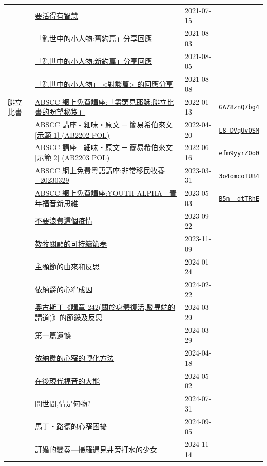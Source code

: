 \documentclass{book}
\begin{document}
{\begin{xltabular}{\textwidth}{|p{0.15\textwidth} p{0.6\textwidth}|p{0.07\textwidth} p{0.1\textwidth}|}
    & \hyperref[sec:2]{要活得有智慧} & 2021-07-15 &  \\
    & \hyperref[sec:3]{「亂世中的小人物:舊約篇」分享回應} & 2021-08-03 &  \\
    & \hyperref[sec:4]{「亂世中的小人物:新約篇」分享回應} & 2021-08-05 &  \\
    & \hyperref[sec:5]{「亂世中的小人物」 <對談篇> 的回應分享} & 2021-08-08 &  \\
腓立比書   & \hyperref[sec:GA78znQ7bg4]{ABSCC 網上免費講座:「盡頭見耶穌:腓立比書的盼望秘笈」} & 2022-01-13 & \href{https://youtube.com/watch?v=GA78znQ7bg4}{\texttt{GA78znQ7bg4}} \\
    & \hyperref[sec:L8_DVqUvOSM]{ABSCC 講座 - 細味‧原文 ─ 簡易希伯來文 [示範 1] (AB2202 POL)} & 2022-04-20 & \href{https://youtube.com/watch?v=L8_DVqUvOSM}{\texttt{L8\_DVqUvOSM}} \\
    & \hyperref[sec:efm9yyrZOo0]{ABSCC 講座 - 細味‧原文 ─ 簡易希伯來文 [示範 2] (AB2203 POL)} & 2022-06-16 & \href{https://youtube.com/watch?v=efm9yyrZOo0}{\texttt{efm9yyrZOo0}} \\
    & \hyperref[sec:3o4omcoTUB4]{ABSCC 網上免費粵語講座:非常移民牧養\_20230329} & 2023-03-31 & \href{https://youtube.com/watch?v=3o4omcoTUB4}{\texttt{3o4omcoTUB4}} \\
    & \hyperref[sec:B5n__dtTRhE]{ABSCC 網上免費講座:YOUTH ALPHA - 青年福音新思維} & 2023-05-03 & \href{https://youtube.com/watch?v=B5n_-dtTRhE}{\texttt{B5n\_-dtTRhE}} \\
    & \hyperref[sec:6]{不要浪費這個疫情} & 2023-09-22 &  \\
    & \hyperref[sec:7]{教牧關顧的可持續節奏} & 2023-11-09 &  \\
    & \hyperref[sec:8]{主顯節的由來和反思} & 2024-01-24 &  \\
    & \hyperref[sec:9]{依納爵的心窄成因} & 2024-02-22 &  \\
    & \hyperref[sec:10]{奧古斯丁《講章 242(關於身體復活,駁異端的講道)》的節錄及反思} & 2024-03-29 &  \\
    & \hyperref[sec:11]{第一篇遺憾} & 2024-03-29 &  \\
    & \hyperref[sec:12]{依納爵的心窄的轉化方法} & 2024-04-18 &  \\
    & \hyperref[sec:13]{在後現代福音的大能} & 2024-05-02 &  \\
    & \hyperref[sec:14]{問世間,情是何物?} & 2024-07-31 &  \\
    & \hyperref[sec:15]{馬丁‧路德的心窄困擾} & 2024-09-05 &  \\
    & \hyperref[sec:16]{訂婚的變奏—掃羅遇見井旁打水的少女} & 2024-11-14 &  \\
\end{xltabular}
}
\newpage
\end{document}
